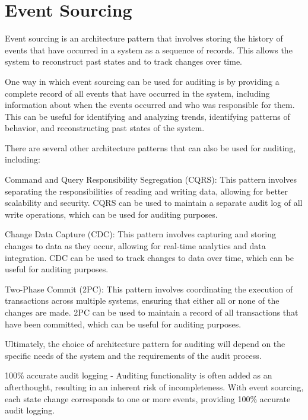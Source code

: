 \section{Event Sourcing}


Event sourcing is an architecture pattern that involves storing the history of events that have occurred in a system as a sequence of records. This allows the system to reconstruct past states and to track changes over time.

One way in which event sourcing can be used for auditing is by providing a complete record of all events that have occurred in the system, including information about when the events occurred and who was responsible for them. This can be useful for identifying and analyzing trends, identifying patterns of behavior, and reconstructing past states of the system.

There are several other architecture patterns that can also be used for auditing, including:

Command and Query Responsibility Segregation (CQRS): This pattern involves separating the responsibilities of reading and writing data, allowing for better scalability and security. CQRS can be used to maintain a separate audit log of all write operations, which can be used for auditing purposes.

Change Data Capture (CDC): This pattern involves capturing and storing changes to data as they occur, allowing for real-time analytics and data integration. CDC can be used to track changes to data over time, which can be useful for auditing purposes.

Two-Phase Commit (2PC): This pattern involves coordinating the execution of transactions across multiple systems, ensuring that either all or none of the changes are made. 2PC can be used to maintain a record of all transactions that have been committed, which can be useful for auditing purposes.

Ultimately, the choice of architecture pattern for auditing will depend on the specific needs of the system and the requirements of the audit process.

100\% accurate audit logging - Auditing functionality is often added as an afterthought, resulting in an inherent risk of incompleteness. With event sourcing, each state change corresponds to one or more events, providing 100\% accurate audit logging.~\citep{richardson2018microservices} %

